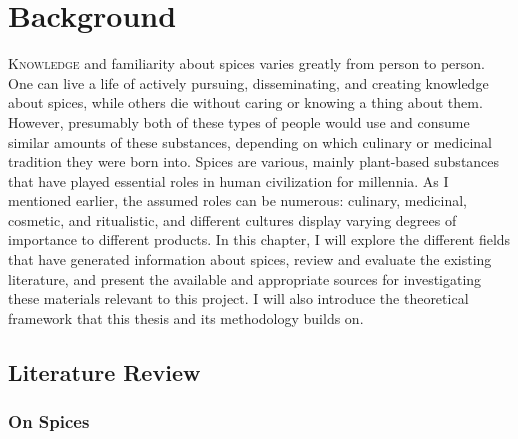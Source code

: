 \chapter{Background}
\label{ch:background}


\lettrine[lines=\iniciale]{\textcolor{\accentcolor}{K}}{nowledge} and familiarity about spices varies greatly from person to person. One can live a life of actively pursuing, disseminating, and creating knowledge about spices, while others die without caring or knowing a thing about them. However, presumably both of these types of people would use and consume similar amounts of these substances, depending on which culinary or medicinal tradition they were born into. Spices are various, mainly plant-based substances that have played essential roles in human civilization for millennia. As I mentioned earlier, the assumed roles can be numerous: culinary, medicinal, cosmetic, and ritualistic, and different cultures display varying degrees of importance to different products. 
In this chapter, I will explore the different fields that have generated information about spices, review and evaluate the existing literature, and present the available and appropriate sources for investigating these materials relevant to this project. I will also introduce the theoretical framework that this thesis and its methodology builds on.

\section{Literature Review}

\subsection{On Spices}

